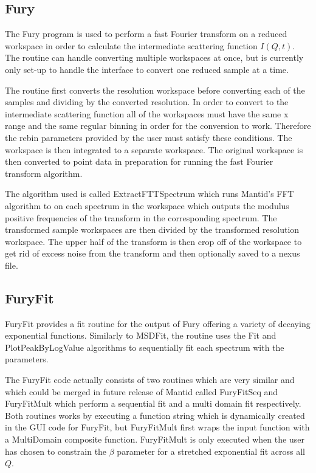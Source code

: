 \documentclass[paper=a4, fontsize=11pt]{scrartcl}	%
\numberwithin{equation}{section}															%
\numberwithin{figure}{section}																%
\numberwithin{table}{section}																%
\begin{document}
\subsection{Fury}
The Fury program is used to perform a fast Fourier transform on a reduced workspace in order to calculate the intermediate scattering function $I(Q,t)$. The routine can handle converting multiple workspaces at once, but is currently only set-up to handle the interface to convert one reduced sample at a time.

The routine first converts the resolution workspace before converting each of the samples and dividing by the converted resolution. In order to convert to the intermediate scattering function all of the workspaces must have the same x range and the same regular binning in order for the conversion to work. Therefore the rebin parameters provided by the user must satisfy these conditions. The workspace is then integrated to a separate workspace. The original workspace is then converted to point data in preparation for running the fast Fourier transform algorithm.

The algorithm used is called ExtractFTTSpectrum which runs Mantid's FFT algorithm to on each spectrum in the workspace which outputs the modulus positive frequencies of the transform in the corresponding spectrum. The transformed sample workspaces are then divided by the transformed resolution workspace. The upper half of the transform is then crop off of the workspace to get rid of excess noise from the transform and then optionally saved to a nexus file.

\subsection{FuryFit}
FuryFit provides a fit routine for the output of Fury offering a variety of decaying exponential functions. Similarly to MSDFit, the routine uses the Fit and PlotPeakByLogValue algorithms to sequentially fit each spectrum with the parameters.

The FuryFit code actually consists of two routines which are very similar and which could be merged in future release of Mantid called FuryFitSeq and FuryFitMult which perform a sequential fit and a multi domain fit respectively. Both routines works by executing a function string which is dynamically created in the GUI code for FuryFit, but FuryFitMult first wraps the input function with a MultiDomain composite function. FuryFitMult is only executed when the user has chosen to constrain the $\beta$ parameter for a stretched exponential fit across all $Q$.
\end{document}
